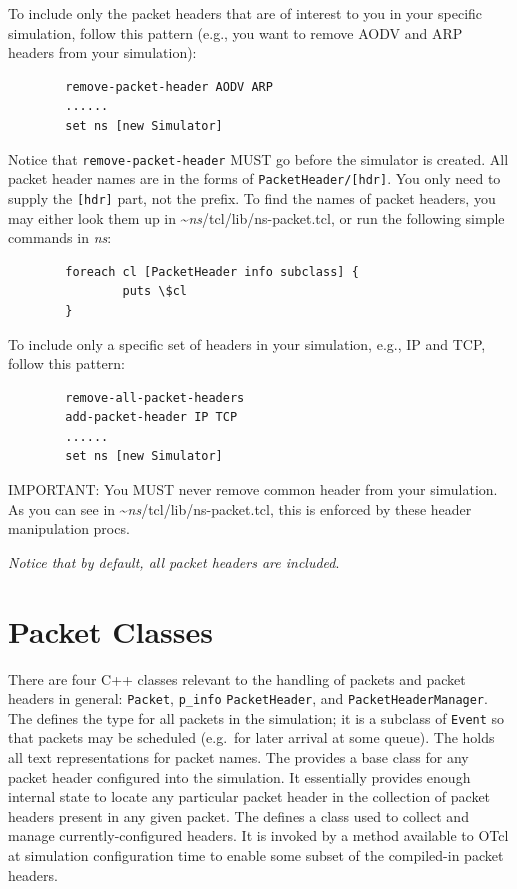 To include only the packet headers that are of interest to you in your 
specific simulation, follow this pattern (e.g., you want to remove AODV
and ARP headers from your simulation):
\begin{verbatim}
        remove-packet-header AODV ARP
        ......
        set ns [new Simulator]
\end{verbatim}
Notice that {\tt remove-packet-header} MUST go before the simulator
is created.
All packet header names are in the forms of
{\tt PacketHeader/[hdr]}. 
You only need to supply the {\tt [hdr]} part, not the prefix.
To find the names of packet headers, you may either look them up in 
\textasciitilde\emph{ns}/{tcl/lib/ns-packet.tcl}, or run the following simple commands in
\emph{ns}: 
\begin{verbatim}
        foreach cl [PacketHeader info subclass] {
                puts \$cl
        }
\end{verbatim} %

To include only a specific set of headers in your simulation, e.g., IP
and TCP, follow this pattern:
\begin{verbatim}
        remove-all-packet-headers
        add-packet-header IP TCP
        ......
        set ns [new Simulator]
\end{verbatim}
IMPORTANT: You MUST never remove common header from your
simulation. 
As you can see in \textasciitilde\emph{ns}/{tcl/lib/ns-packet.tcl}, this is enforced
by these header manipulation procs.

{\em Notice that by default, all packet headers are included}.

\section{Packet Classes}
\label{sec:packetclasses}

There are four C++ classes relevant to the handling of packets
and packet headers in general: {\tt Packet}, {\tt p\_info}
{\tt PacketHeader}, and {\tt PacketHeaderManager}.
The 
defines the type for all packets in the simulation;
it is a subclass of {\tt Event} so that packets may
be scheduled (e.g.~for later arrival at some queue).
The  holds all text
representations for packet names.
The  provides a base class for
any packet header configured into the simulation.
It essentially provides 
enough internal state to locate any particular packet
header in the collection of packet headers present in any given packet.
The 
defines a class used to collect and manage currently-configured headers.
It is invoked by a method available to OTcl at simulation configuration
time to enable some subset of the compiled-in packet headers.


